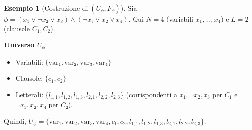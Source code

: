 \documentclass[a4paper]{article}
\theoremstyle{definition} %
\newtheorem{example}{Esempio}
\begin{document}
\begin{example}[Costruzione di $(U_\phi, F_\phi)$]
Sia $\phi = (x_1 \lor \neg x_2 \lor x_3) \land (\neg x_1 \lor x_2 \lor x_4)$.
Qui $N=4$ (variabili $x_1, \ldots, x_4$) e $L=2$ (clausole $C_1, C_2$).

\textbf{Universo $U_\phi$:}
\begin{itemize}
    \item Variabili: $\{\text{var}_1, \text{var}_2, \text{var}_3, \text{var}_4\}$
    \item Clausole: $\{c_1, c_2\}$
    \item Letterali: $\{l_{1,1}, l_{1,2}, l_{1,3}, l_{2,1}, l_{2,2}, l_{2,3}\}$ (corrispondenti a $x_1, \neg x_2, x_3$ per $C_1$ e $\neg x_1, x_2, x_4$ per $C_2$).
\end{itemize}
Quindi, $U_\phi = \{\text{var}_1, \text{var}_2, \text{var}_3, \text{var}_4, c_1, c_2, l_{1,1}, l_{1,2}, l_{1,3}, l_{2,1}, l_{2,2}, l_{2,3}\}$.


\end{example}
\end{document}
